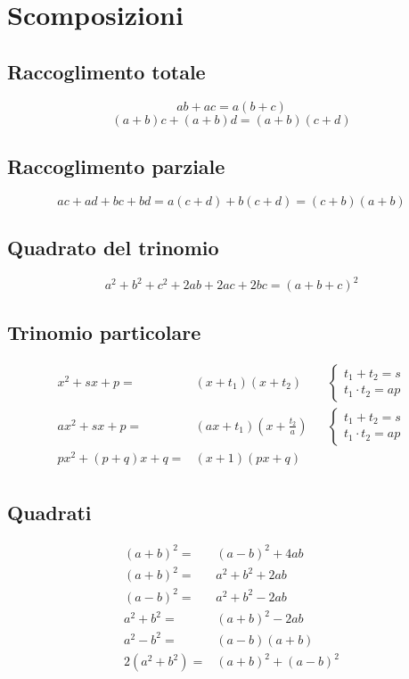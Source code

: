 \chapter{Scomposizioni}
\section{Raccoglimento totale}
\begin{equation*}
ab+ac=a(b+c)
\end{equation*}
\begin{equation*}
(a+b)c+(a+b)d=(a+b)(c+d)
\end{equation*}
\section{Raccoglimento parziale}
\begin{equation*}
ac+ad+bc+bd=a(c+d)+b(c+d)=(c+b)(a+b)
\end{equation*}
\section{Quadrato del trinomio}
\begin{equation*}
a^2+b^2+c^2+2ab+2ac+2bc=(a+b+c)^2
\end{equation*}
\section{Trinomio particolare}
\begin{align*}
x^2+sx+p=&(x+t_1)(x+t_2)&&\begin{cases}
t_1+t_2=s\\
t_1\cdot t_2=ap
\end{cases}\\
ax^2+sx+p=&(ax+t_1)(x+\frac{t_2}{a})&&\begin{cases}
t_1+t_2=s\\
t_1\cdot t_2=ap
\end{cases}\\
px^2+(p+q)x+q=&(x+1)(px+q)\\
\end{align*}
\section{Quadrati}
\begin{align*}
(a+b)^2=&(a-b)^2+4ab\\
(a+b)^2=&a^2+b^2+2ab\\
(a-b)^2=&a^2+b^2-2ab\\
a^2+b^2=&(a+b)^2-2ab\\
a^2-b^2=&(a-b)(a+b)\\
2(a^2+b^2)=&(a+b)^2+(a-b)^2\\
\end{align*}
